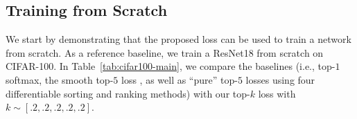 \documentclass{article}
\begin{document}
\begin{table}[t]
    \centering
    \addtolength{\tabcolsep}{-4pt}  
    \addtolength{\tabcolsep}{4pt}  
    \vspace*{-.25em}
    \caption{
        CIFAR-100 results for training a ResNet18 from scratch.
        The metrics are Top-$1\,|\,$Top-$5$ accuracy averaged over 2 seeds.
        $(*)$:~\citet{berrada2018smooth}.
    }
    \label{tab:cifar100-main}
    \vspace*{-2em}
\end{table}





\subsection{Training from Scratch}

We start by demonstrating that the proposed loss can be used to train a network from scratch. 
As a reference baseline, we train a ResNet18 from scratch on CIFAR-100.
In Table~\ref{tab:cifar100-main}, we compare the baselines (i.e., top-$1$ softmax, the smooth top-$5$ loss \citep{berrada2018smooth}, as well as ``pure'' top-$5$ losses using four differentiable sorting and ranking methods) with our top-$k$ loss with $k\sim[.2,.2,.2,.2,.2]$.
\end{document}

